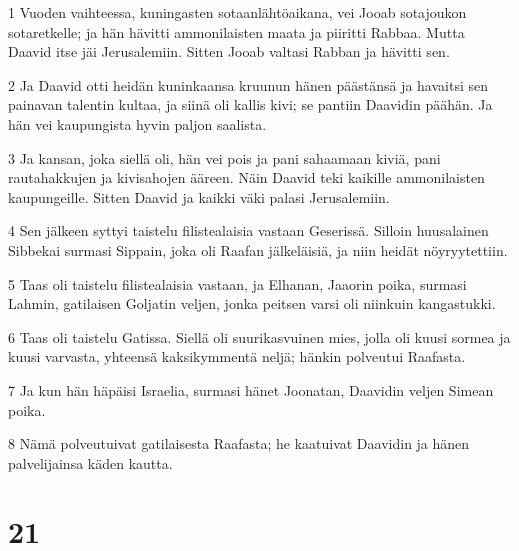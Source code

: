 \par 1 Vuoden vaihteessa, kuningasten sotaanlähtöaikana, vei Jooab sotajoukon sotaretkelle; ja hän hävitti ammonilaisten maata ja piiritti Rabbaa. Mutta Daavid itse jäi Jerusalemiin. Sitten Jooab valtasi Rabban ja hävitti sen.
\par 2 Ja Daavid otti heidän kuninkaansa kruunun hänen päästänsä ja havaitsi sen painavan talentin kultaa, ja siinä oli kallis kivi; se pantiin Daavidin päähän. Ja hän vei kaupungista hyvin paljon saalista.
\par 3 Ja kansan, joka siellä oli, hän vei pois ja pani sahaamaan kiviä, pani rautahakkujen ja kivisahojen ääreen. Näin Daavid teki kaikille ammonilaisten kaupungeille. Sitten Daavid ja kaikki väki palasi Jerusalemiin.
\par 4 Sen jälkeen syttyi taistelu filistealaisia vastaan Geserissä. Silloin huusalainen Sibbekai surmasi Sippain, joka oli Raafan jälkeläisiä, ja niin heidät nöyryytettiin.
\par 5 Taas oli taistelu filistealaisia vastaan, ja Elhanan, Jaaorin poika, surmasi Lahmin, gatilaisen Goljatin veljen, jonka peitsen varsi oli niinkuin kangastukki.
\par 6 Taas oli taistelu Gatissa. Siellä oli suurikasvuinen mies, jolla oli kuusi sormea ja kuusi varvasta, yhteensä kaksikymmentä neljä; hänkin polveutui Raafasta.
\par 7 Ja kun hän häpäisi Israelia, surmasi hänet Joonatan, Daavidin veljen Simean poika.
\par 8 Nämä polveutuivat gatilaisesta Raafasta; he kaatuivat Daavidin ja hänen palvelijainsa käden kautta.

\chapter{21}

